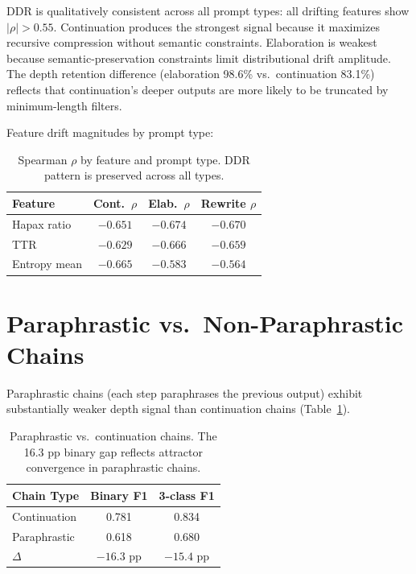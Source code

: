 \documentclass[11pt,twocolumn]{article}
\begin{document}
DDR is qualitatively consistent across all prompt types: all drifting features show $|\rho| > 0.55$.
Continuation produces the strongest signal because it maximizes recursive compression without semantic constraints.
Elaboration is weakest because semantic-preservation constraints limit distributional drift amplitude.
The depth retention difference (elaboration 98.6\% vs.\ continuation 83.1\%) reflects that continuation's deeper outputs are more likely to be truncated by minimum-length filters.

Feature drift magnitudes by prompt type:

\begin{table}[h]
\centering
\small
\begin{tabular}{lccc}
\toprule
\textbf{Feature} & \textbf{Cont.\ $\rho$} & \textbf{Elab.\ $\rho$} & \textbf{Rewrite $\rho$} \\
\midrule
Hapax ratio & $-0.651$ & $-0.674$ & $-0.670$ \\
TTR & $-0.629$ & $-0.666$ & $-0.659$ \\
Entropy mean & $-0.665$ & $-0.583$ & $-0.564$ \\
\bottomrule
\end{tabular}
\caption{Spearman $\rho$ by feature and prompt type. DDR pattern is preserved across all types.}
\end{table}


\section{Paraphrastic vs.\ Non-Paraphrastic Chains}
\label{sec:paraphrastic}

Paraphrastic chains (each step paraphrases the previous output) exhibit substantially weaker depth signal than continuation chains (Table~\ref{tab:para}).

\begin{table}[h]
\centering
\small
\begin{tabular}{lcc}
\toprule
\textbf{Chain Type} & \textbf{Binary F1} & \textbf{3-class F1} \\
\midrule
Continuation & 0.781 & 0.834 \\
Paraphrastic & 0.618 & 0.680 \\
\midrule
$\Delta$ & $-16.3$ pp & $-15.4$ pp \\
\bottomrule
\end{tabular}
\caption{Paraphrastic vs.\ continuation chains. The 16.3 pp binary gap reflects attractor convergence in paraphrastic chains.}
\label{tab:para}
\end{table}
\end{document}
